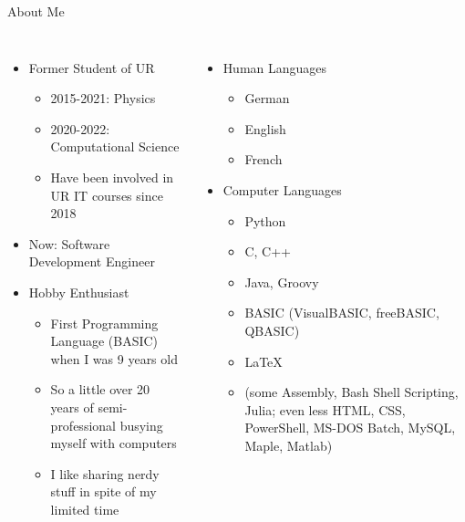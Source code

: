 
\begin{frame}[t,plain]
\titlepage
\end{frame}


\begin{frame}{About Me}
%
\begin{columns}
\begin{itemize}
\item Former Student of UR
	\begin{itemize}
	\item 2015-2021: Physics
	\item 2020-2022: Computational Science
	\item Have been involved in UR IT courses since 2018
	\end{itemize}
\item Now: Software Development Engineer
\item Hobby Enthusiast
	\begin{itemize}
	\item First Programming Language (BASIC) when I was 9 years old
	\item So a little over 20 years of semi-professional busying myself with computers
	\item I like sharing nerdy stuff in spite of my limited time
	\end{itemize}
\end{itemize}
%
\begin{itemize}
\item Human Languages
	\begin{itemize}
	\item German
	\item English
	\item French
	\end{itemize}
\item Computer Languages
	\begin{itemize}
	\item Python
	\item C, C++
	\item Java, Groovy
	\item BASIC (VisualBASIC, freeBASIC, QBASIC)
	\item \LaTeX
	\item (some Assembly, Bash Shell Scripting, Julia; even less HTML, CSS, PowerShell, MS-DOS Batch, MySQL, Maple, Matlab)
	\end{itemize}
\end{itemize}
\end{columns}
%
\end{frame}

